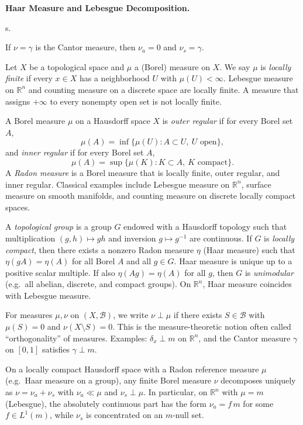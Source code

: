 \begin{problem}[CP-II-0309]
\label{prob:cp-ii-0309}
\textbf{Haar Measure and Lebesgue Decomposition.}

\hspace*{1.5em}s.

If \(\nu=\gamma\) is the Cantor measure, then \(\nu_a=0\) and \(\nu_s=\gamma\).

	Let $X$ be a topological space and $\mu$ a (Borel) measure on $X$.
	We say $\mu$ is \emph{locally finite} if every $x\in X$ has a neighborhood $U$
	with $\mu(U)<\infty$.
	Lebesgue measure on $\mathbb{R}^n$ and counting measure on a discrete space are locally finite.
	A measure that assigns $+\infty$ to every nonempty open set is not locally finite.

	\bigskip

	A Borel measure $\mu$ on a Hausdorff space $X$ is
	\emph{outer regular} if for every Borel set $A$,
	\[
	\mu(A)=\inf\{\mu(U): A\subset U,\ U\text{ open}\},
	\]
	and \emph{inner regular} if for every Borel set $A$,
	\[
	\mu(A)=\sup\{\mu(K): K\subset A,\ K\text{ compact}\}.
	\]
	A \emph{Radon measure} is a Borel measure that is locally finite, outer regular, and inner regular.
	Classical examples include Lebesgue measure on $\mathbb{R}^n$, surface measure on smooth manifolds,
	and counting measure on discrete locally compact spaces.

	\bigskip

	A \emph{topological group} is a group $G$ endowed with a Hausdorff topology such that
	multiplication $(g,h)\mapsto gh$ and inversion $g\mapsto g^{-1}$ are continuous.
	If $G$ is \emph{locally compact}, then there exists a nonzero Radon measure $\eta$
	(Haar measure) such that $\eta(gA)=\eta(A)$ for all Borel $A$ and all $g\in G$.
	Haar measure is unique up to a positive scalar multiple.
	If also $\eta(Ag)=\eta(A)$ for all $g$, then $G$ is \emph{unimodular}
	(e.g.\ all abelian, discrete, and compact groups).
	On $\mathbb{R}^n$, Haar measure coincides with Lebesgue measure.

	\bigskip

	For measures $\mu,\nu$ on $(X,\mathcal{B})$, we write $\nu\perp\mu$ if there exists
	$S\in\mathcal{B}$ with $\mu(S)=0$ and $\nu(X\setminus S)=0$.
	This is the measure-theoretic notion often called ``orthogonality'' of measures.
	Examples: $\delta_x\perp m$ on $\mathbb{R}^n$, and the Cantor measure $\gamma$ on $[0,1]$ satisfies $\gamma\perp m$.

	\bigskip

	On a locally compact Hausdorff space with a Radon reference measure $\mu$ (e.g.\ Haar measure on a group),
	any finite Borel measure $\nu$ decomposes uniquely as $\nu=\nu_a+\nu_s$ with $\nu_a\ll\mu$ and $\nu_s\perp\mu$.
	In particular, on $\mathbb{R}^n$ with $\mu=m$ (Lebesgue), the absolutely continuous part has the
	form $\nu_a=f\,m$ for some $f\in L^1(m)$, while $\nu_s$ is concentrated on an $m$-null set.


\end{problem}
